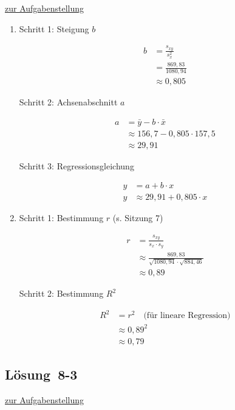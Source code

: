 \documentclass[
  11pt,
  ngerman,
  a4paper,
]{report}
\begin{document}
\protect\hyperlink{aufgabe-8-2}{zur Aufgabenstellung}

\begin{enumerate}
\def\labelenumi{\alph{enumi})}
\item
  Schritt 1: Steigung \(b\)

  \[\begin{aligned}
   b&=\frac{s_{xy}}{s^2_x}\\
    &=\frac{869{,}83}{1080{,}94}\\
    &\approx0{,}805
   \end{aligned}\]

  Schritt 2: Achsenabschnitt \(a\)

  \[\begin{aligned}
   a&=\bar{y}-b\cdot\bar{x}\\
   &\approx 156{,}7-0{,}805\cdot157{,}5\\
   &\approx 29{,}91
   \end{aligned}\]

  Schritt 3: Regressionsgleichung

  \[\begin{aligned}
   y&=a+b\cdot x\\
   y&\approx 29{,}91 + 0{,}805 \cdot x
   \end{aligned}\]
\item
  Schritt 1: Bestimmung \(r\) (s. Sitzung 7)

  \[\begin{aligned}
   r&=\frac{s_{xy}}{s_x\cdot s_y}\\
   &\approx\frac{869{,}83}{\sqrt{1080{,}94}\cdot\sqrt{884{,}46}}\\
   &\approx0{,}89
   \end{aligned}\]

  Schritt 2: Bestimmung \(R^2\)

  \[\begin{aligned}
   R^2&=r^2 \quad \textrm{(für lineare Regression)}\\
   &\approx 0{,}89^2\\
   &\approx0{,}79
   \end{aligned}\]
\end{enumerate}

\hypertarget{loesung-8-3}{%
\subsection{Lösung~8-3}\label{loesung-8-3}}

\protect\hyperlink{aufgabe-8-3}{zur Aufgabenstellung}
\end{document}

